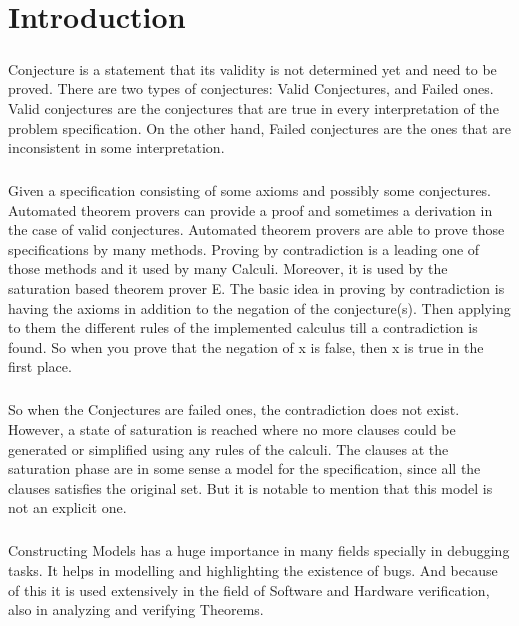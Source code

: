 \chapter{Introduction}\label{chap:intro}

	\nocite{*} 
	
	\paragraph{}
	Conjecture is a statement that its validity is not determined yet and need to be proved. There are two types of conjectures: Valid Conjectures, and Failed ones. Valid conjectures are the conjectures that are true in every interpretation of the problem specification. On the other hand, Failed conjectures are the ones that are inconsistent in some interpretation.
	
	
	\paragraph{}
	Given a specification consisting of some axioms and possibly some conjectures. Automated theorem provers can provide a proof and sometimes a derivation in the case of valid conjectures. Automated theorem provers are able to prove those specifications by many methods. Proving by contradiction is a leading one of those methods and it used by many Calculi. Moreover, it is used by the saturation based theorem prover E. The basic idea in proving by contradiction is having the axioms in addition to the negation of the conjecture(s). Then applying to them the different rules of the implemented calculus till a contradiction is found. So when you prove that the negation of x is false, then x is true in the first place.
	
	
	\paragraph{}
	So when the Conjectures are failed ones, the contradiction does not exist. However, a state of saturation is reached where no more clauses could be generated or simplified using any rules of the calculi. The clauses at the saturation phase are in some sense a model for the specification, since all the clauses satisfies the original set. But it is notable to mention that this model is not an explicit one.  
	
	
	\paragraph{}
	Constructing Models has a huge importance in many fields specially in debugging tasks. It helps in modelling and highlighting the existence of bugs. And because of this it is used extensively in the field of Software and Hardware verification, also in analyzing and verifying Theorems.

